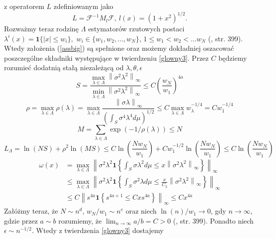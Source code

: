\documentclass[man,mfiu]{mgrwms}
\newcommand{\norm}[1]{\left\lVert#1\right\rVert}
\begin{document}
z operatorem $L$ zdefiniowanym jako 
\begin{displaymath}
L=\mathcal{F}^{-1}M_l\mathcal{F},\ l(x)=(1+x^2)^{1/2}.
\end{displaymath}
\indent Rozważmy teraz rodzinę $\Lambda$ estymatorów rzutowych postaci $\lambda^i(x)=\pmb{1}\{|x|\leq w_i\},$ $w_i\in \{w_1,w_2,\dots, w_N\}$, $1\leq w_1<w_2<\dots w_N$ (\cite{cavalier2}, str. 399). Wtedy założenia (\ref{assbig}) są spełnione oraz możemy dokładniej oszacować poszczególne składniki występujące w twierdzeniu \ref{glowny3}. Przez $C$ będziemy rozumieć dodatnią stałą niezależącą od $\lambda,\theta	,\epsilon$
\begin{displaymath}
S=\frac{\max_{\lambda\in \Lambda}\norm{\sigma^2\lambda^2}_{\infty}}{\min_{\lambda\in \Lambda}\norm{\sigma^2\lambda^2}_{\infty}}\leq C\left(\frac{w_N}{w_1}\right)^{4a}
\end{displaymath}
\begin{displaymath}
\rho=\max_{\lambda\in \Lambda}\rho(\lambda)=\max_{\lambda\in \Lambda}\frac{\norm{\sigma\lambda}_{\infty}}{\left(\int_S\sigma^4\lambda^4d\mu\right)^{1/2}}\leq C\max_{\lambda\in \Lambda}w_{\lambda}^{-1/4}=Cw_1^{-1/4}
\end{displaymath}
\begin{displaymath}
M=\sum_{\lambda\in \Lambda}\exp(-1/\rho(\lambda))\leq N
\end{displaymath}
\begin{displaymath}
L_{\Lambda}=\ln(NS)+\rho^2\ln(MS)\leq C\ln\left(\frac{Nw_N}{w_1}\right)+Cw_1^{-1/2}\ln\left(\frac{Nw_N}{w_1}\right)\leq C\ln\left(\frac{Nw_N}{w_1}\right)
\end{displaymath}
\begin{displaymath}
\begin{split}
\omega(x)&=\max_{\lambda\in \Lambda}\norm{\sigma^2\lambda^2\pmb{1}\left\{\int_S\sigma\lambda^2d\mu\leq x\norm{\sigma^2\lambda^2}_{\infty}\right\}}_{\infty}\\ 
&\leq \max_{\lambda\in \Lambda}\norm{\sigma^2\lambda^2\pmb{1}\left\{\int_S\sigma^2\lambda d\mu\leq \frac{x}{C_2}\norm{\sigma^2\lambda^2}_{\infty}\right\}}_{\infty}\\
&\leq C\norm{s^{4a}\pmb{1}\left\{s^{4a+1}\leq Cxs^{4a}\right\}}_{\infty}\leq Cx^{4a}
\end{split}
\end{displaymath}
Załóżmy teraz, że $N\sim n^d$, $w_N/w_1\sim n^e$ oraz niech $\ln(n)/w_1\to 0$, gdy $n\to \infty$, gdzie przez $a\sim b$ rozumiemy, że $\lim_{n\to \infty}a/b=C>0$ (\cite{cavalier2}, str. 399). Ponadto niech $\epsilon\sim n^{-1/2}$. Wtedy z twierdzenia \ref{glowny3} dostajemy
\end{document}
